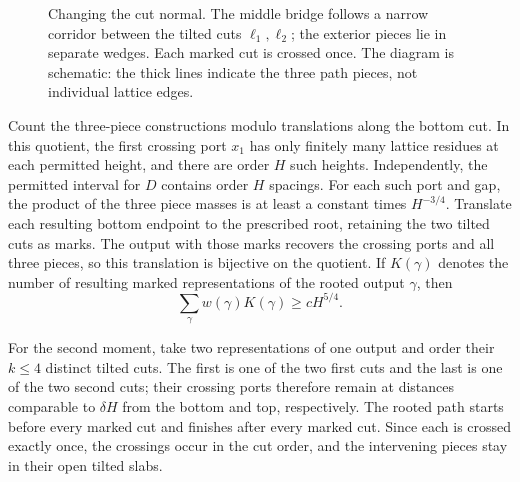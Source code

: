 \begin{figure}[htbp]
\centering
{}
\caption{Changing the cut normal. The middle bridge follows a narrow
corridor between the tilted cuts $\ell_1,\ell_2$; the exterior pieces lie in separate
wedges. Each marked cut is crossed once. The diagram is schematic: the
thick lines indicate the three path pieces, not individual lattice edges.}
\label{a:tilted-corridor}
\end{figure}

Count the three-piece constructions modulo translations along the
bottom cut. In this quotient, the first crossing port $x_1$ has only
finitely many lattice residues at each permitted height, and there
are order $H$ such heights. Independently, the permitted interval
for $D$ contains order $H$ spacings. For each such port and gap, the
product of the three piece masses is at least a constant times
$H^{-3/4}$. Translate each resulting bottom endpoint to the prescribed root, retaining the two tilted cuts as
marks. The output with those marks recovers the crossing ports and
all three pieces, so this translation is bijective on the quotient.
If $K(\gamma)$ denotes the number of resulting marked representations
of the rooted output $\gamma$, then
\[
 \sum_\gamma w(\gamma)K(\gamma)\ge cH^{5/4}.
\]

For the second moment, take two representations of one output and
order their $k\le4$ distinct tilted cuts. The first is one of the
two first cuts and the last is one of the two second cuts; their
crossing ports therefore remain at distances comparable to $\delta H$
from the bottom and top, respectively. The rooted path starts before
every marked cut and finishes after every marked cut. Since each is
crossed exactly once, the crossings occur in the cut order, and the
intervening pieces stay in their open tilted slabs.

